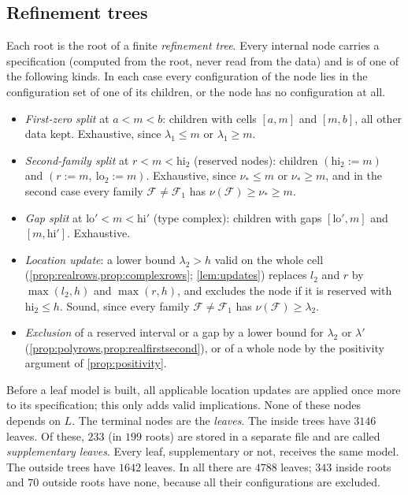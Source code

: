 \documentclass[11pt]{amsart}
\numberwithin{equation}{section}
\theoremstyle{plain}
\theoremstyle{definition}
\theoremstyle{remark}
\newcommand{\lo}{\mathrm{lo}}
\newcommand{\hi}{\mathrm{hi}}
\newcommand{\1}{\mathbf{1}}
\begin{document}
\subsection{Refinement trees}\label{subsec:refinement}
Each root is the root of a finite \emph{refinement tree}. Every internal node carries a
specification (computed from the root, never read from the data) and is of one of the following
kinds. In each case every configuration of the node lies in the configuration set of one of its
children, or the node has no configuration at all.
\begin{itemize}
  \item \emph{First-zero split} at $a<m<b$: children with cells $[a,m]$ and $[m,b]$, all other data
    kept. Exhaustive, since $\lambda_1\le m$ or $\lambda_1\ge m$.
  \item \emph{Second-family split} at $r<m<\hi_2$ (reserved nodes): children $(\hi_2:=m)$ and
    $(r:=m,\ \lo_2:=m)$. Exhaustive, since $\nu_*\le m$ or $\nu_*\ge m$, and in the second case every
    family $\mathcal F\ne\mathcal F_1$ has $\nu(\mathcal F)\ge\nu_*\ge m$.
  \item \emph{Gap split} at $\lo'<m<\hi'$ (type $\mathrm{complex}$): children with gaps $[\lo',m]$ and
    $[m,\hi']$. Exhaustive.
  \item \emph{Location update}: a lower bound $\lambda_2>h$ valid on the whole cell
    (\cref{prop:realrows,prop:complexrows}; \cref{lem:updates}) replaces $l_2$ and $r$ by $\max(l_2,h)$ and
    $\max(r,h)$, and excludes the node if it is reserved with $\hi_2\le h$. Sound, since every family
    $\mathcal F\ne\mathcal F_1$ has $\nu(\mathcal F)\ge\lambda_2$.
  \item \emph{Exclusion} of a reserved interval or a gap by a lower bound for $\lambda_2$ or
    $\lambda'$ (\cref{prop:polyrows,prop:realfirstsecond}), or of a whole node by the positivity
    argument of \cref{prop:positivity}.
\end{itemize}
Before a leaf model is built, all applicable location updates are applied once more to its
specification; this only adds valid implications. None of these nodes depends on $L$. The terminal
nodes are the \emph{leaves}. The inside trees have $3146$ leaves. Of these, $233$ (in $199$ roots) are
stored in a separate file and are called \emph{supplementary leaves}. Every leaf,
supplementary or not, receives the same model. The
outside trees have $1642$ leaves. In all there are $4788$ leaves; $343$ inside roots and $70$
outside roots have none, because all their configurations are excluded.
\end{document}
